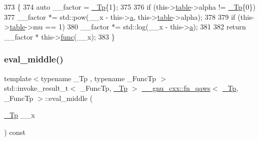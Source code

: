 \begin{DoxyCode}
373     \{
374       \textcolor{keyword}{auto} \_\_factor = \hyperlink{namespace____gnu__cxx_a3b19a9c800ca194374ef9172290f7d79}{\_Tp}\{1\};
375 
376       \textcolor{keywordflow}{if} (this->\hyperlink{struct____gnu__cxx_1_1fn__qaws_a8a96359bac745cd83938fc0735a9168d}{table}->alpha != \hyperlink{namespace____gnu__cxx_a3b19a9c800ca194374ef9172290f7d79}{\_Tp}\{0\})
377         \_\_factor *= std::pow(\_\_x - this->\hyperlink{struct____gnu__cxx_1_1fn__qaws_afe83dc1c94299aedf4cb7be0499fe572}{a}, this->\hyperlink{struct____gnu__cxx_1_1fn__qaws_a8a96359bac745cd83938fc0735a9168d}{table}->alpha);
378 
379       \textcolor{keywordflow}{if} (this->\hyperlink{struct____gnu__cxx_1_1fn__qaws_a8a96359bac745cd83938fc0735a9168d}{table}->mu == 1)
380         \_\_factor *= std::log(\_\_x - this->\hyperlink{struct____gnu__cxx_1_1fn__qaws_afe83dc1c94299aedf4cb7be0499fe572}{a});
381 
382       \textcolor{keywordflow}{return} \_\_factor * this->\hyperlink{struct____gnu__cxx_1_1fn__qaws_a0fe42f7ea452aae136c5dba3264c3e93}{func}(\_\_x);
383     \}
\end{DoxyCode}
\mbox{\label{struct____gnu__cxx_1_1fn__qaws_af2df56d9df764744fd045d26b5ef1c95}} 
\subsubsection{\texorpdfstring{eval\+\_\+middle()}{eval\_middle()}}
{\footnotesize\ttfamily template$<$typename \+\_\+\+Tp , typename \+\_\+\+Func\+Tp $>$ \\
std\+::invoke\+\_\+result\+\_\+t$<$ \+\_\+\+Func\+Tp, \hyperlink{namespace____gnu__cxx_a3b19a9c800ca194374ef9172290f7d79}{\+\_\+\+Tp} $>$ \hyperlink{struct____gnu__cxx_1_1fn__qaws}{\+\_\+\+\_\+gnu\+\_\+cxx\+::fn\+\_\+qaws}$<$ \hyperlink{namespace____gnu__cxx_a3b19a9c800ca194374ef9172290f7d79}{\+\_\+\+Tp}, \+\_\+\+Func\+Tp $>$\+::eval\+\_\+middle (\begin{DoxyParamCaption}\item[{\hyperlink{namespace____gnu__cxx_a3b19a9c800ca194374ef9172290f7d79}{\+\_\+\+Tp}}]{\+\_\+\+\_\+x }\end{DoxyParamCaption}) const}



